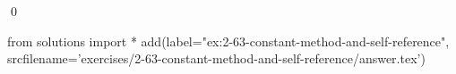 
\begin{ex}
  \label{ex:2-63-constant-method-and-self-reference}
  
  \qed
\end{ex}
\begin{python0}
from solutions import *
add(label="ex:2-63-constant-method-and-self-reference",
    srcfilename='exercises/2-63-constant-method-and-self-reference/answer.tex')
\end{python0}
